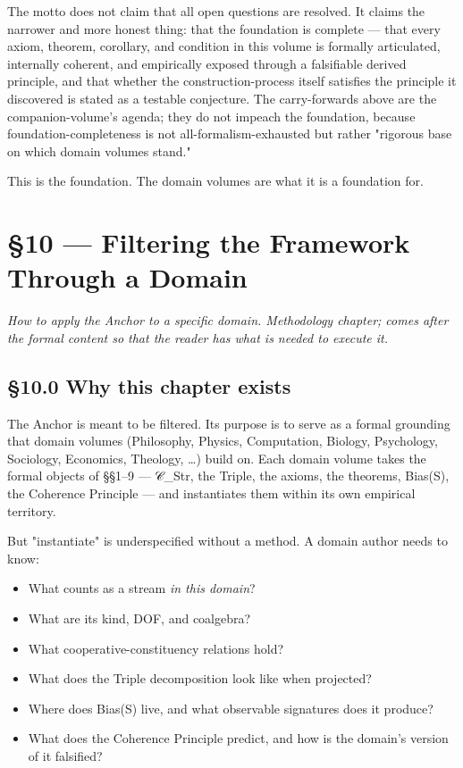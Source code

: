 \documentclass[11pt, openany]{book}
\newcommand{\sectionbreak}{\clearpage}
\begin{document}
The motto does not claim that all open questions are resolved. It claims the narrower and more honest thing: that the foundation is complete --- that every axiom, theorem, corollary, and condition in this volume is formally articulated, internally coherent, and empirically exposed through a falsifiable derived principle, and that whether the construction-process itself satisfies the principle it discovered is stated as a testable conjecture. The carry-forwards above are the companion-volume's agenda; they do not impeach the foundation, because foundation-completeness is not all-formalism-exhausted but rather "rigorous base on which domain volumes stand."

This is the foundation. The domain volumes are what it is a foundation for.

\chapter{§10 — Filtering the Framework Through a Domain}


\textit{How to apply the Anchor to a specific domain. Methodology chapter; comes after the formal content so that the reader has what is needed to execute it.}

\sectionbreak

\section{§10.0 Why this chapter exists}

The Anchor is meant to be filtered. Its purpose is to serve as a formal grounding that domain volumes (Philosophy, Physics, Computation, Biology, Psychology, Sociology, Economics, Theology, …) build on. Each domain volume takes the formal objects of §§1–9 --- 𝒞\_\allowbreak{}Str, the Triple, the axioms, the theorems, Bias(S), the Coherence Principle --- and instantiates them within its own empirical territory.

But "instantiate" is underspecified without a method. A domain author needs to know:

\begin{itemize}
\item What counts as a stream \textit{in this domain}?
\item What are its kind, DOF, and coalgebra?
\item What cooperative-constituency relations hold?
\item What does the Triple decomposition look like when projected?
\item Where does Bias(S) live, and what observable signatures does it produce?
\item What does the Coherence Principle predict, and how is the domain's version of it falsified?
\end{itemize}
\end{document}
